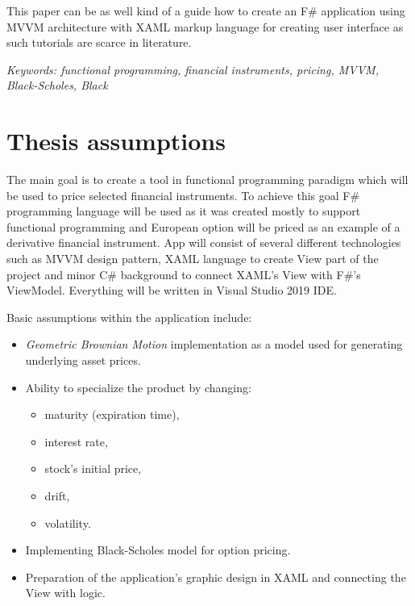    This paper can be as well kind of a guide how to create an F\# application using MVVM architecture with XAML markup language for creating user interface as such tutorials are scarce in literature.
    
    \emph{Keywords: functional programming, financial instruments, pricing, MVVM, Black-Scholes, Black}

\section{Thesis assumptions}
    The main goal is to create a tool in functional programming paradigm which will be used to price selected financial instruments. To achieve this goal F\# programming language will be used as it was created mostly to support functional programming and European option will be priced as an example of a derivative financial instrument.
    App will consist of several different technologies such as MVVM design pattern, XAML language to create View part of the project and minor C\# background to connect XAML's View with F\#'s ViewModel. Everything will be written in Visual Studio 2019 IDE.
    
    Basic assumptions within the application include:
    \begin{itemize}
        \item \textit{Geometric Brownian Motion} implementation as a model used for generating underlying asset prices.
        \item Ability to specialize the product by changing:
            \begin{itemize}
                \item maturity (expiration time),
                \item interest rate,
                \item stock's initial price,
                \item drift,
                \item volatility.
            \end{itemize}
        \item Implementing Black-Scholes model for option pricing.
        \item Preparation of the application's graphic design in XAML and connecting the View with logic.
    \end{itemize}


